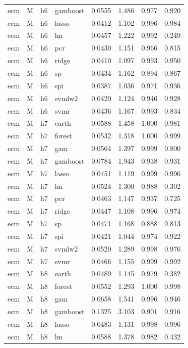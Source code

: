 \begin{ThreePartTable}
\begin{longtable}[t]{llclcccc}
ecm & M & h6 & gamboost & 0.0555 & 1.486 & 0.977 & 0.920\\
ecm & M & h6 & lasso & 0.0412 & 1.102 & 0.996 & 0.984\\
ecm & M & h6 & lm & 0.0457 & 1.222 & 0.992 & 0.249\\
ecm & M & h6 & pcr & 0.0430 & 1.151 & 0.966 & 0.815\\
ecm & M & h6 & ridge & 0.0410 & 1.097 & 0.993 & 0.950\\
ecm & M & h6 & sp & 0.0434 & 1.162 & 0.894 & 0.867\\
ecm & M & h6 & spi & 0.0387 & 1.036 & 0.971 & 0.936\\
ecm & M & h6 & svmlw2 & 0.0420 & 1.124 & 0.946 & 0.928\\
ecm & M & h6 & svmr & 0.0436 & 1.167 & 0.993 & 0.834\\
\addlinespace
ecm & M & h7 & earth & 0.0588 & 1.458 & 1.000 & 0.981\\
ecm & M & h7 & forest & 0.0532 & 1.318 & 1.000 & 0.999\\
ecm & M & h7 & gam & 0.0564 & 1.397 & 0.999 & 0.800\\
ecm & M & h7 & gamboost & 0.0784 & 1.943 & 0.938 & 0.931\\
ecm & M & h7 & lasso & 0.0451 & 1.119 & 0.999 & 0.996\\
ecm & M & h7 & lm & 0.0524 & 1.300 & 0.988 & 0.302\\
ecm & M & h7 & pcr & 0.0463 & 1.147 & 0.937 & 0.725\\
ecm & M & h7 & ridge & 0.0447 & 1.108 & 0.996 & 0.974\\
ecm & M & h7 & sp & 0.0471 & 1.168 & 0.888 & 0.813\\
ecm & M & h7 & spi & 0.0421 & 1.044 & 0.974 & 0.922\\
ecm & M & h7 & svmlw2 & 0.0520 & 1.289 & 0.998 & 0.976\\
ecm & M & h7 & svmr & 0.0466 & 1.155 & 0.999 & 0.992\\
\addlinespace
ecm & M & h8 & earth & 0.0489 & 1.145 & 0.979 & 0.382\\
ecm & M & h8 & forest & 0.0552 & 1.293 & 1.000 & 0.998\\
ecm & M & h8 & gam & 0.0658 & 1.541 & 0.996 & 0.946\\
ecm & M & h8 & gamboost & 0.1325 & 3.103 & 0.901 & 0.916\\
ecm & M & h8 & lasso & 0.0483 & 1.131 & 0.998 & 0.996\\
ecm & M & h8 & lm & 0.0588 & 1.378 & 0.982 & 0.432\\

\end{longtable}
\end{ThreePartTable}
